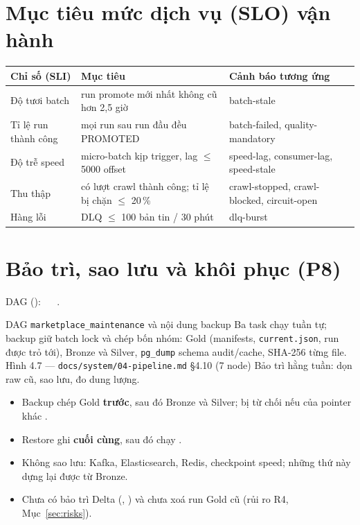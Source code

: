 \section{Mục tiêu mức dịch vụ (SLO) vận hành}
\begin{xltabular}{\linewidth}{@{}L{36mm}Y L{40mm}@{}}
  \toprule
  \textbf{Chỉ số (SLI)} & \textbf{Mục tiêu} & \textbf{Cảnh báo tương ứng} \\
  \midrule
  Độ tươi batch & run promote mới nhất không cũ hơn 2,5 giờ & batch-stale \\
  Tỉ lệ run thành công & mọi run sau run đầu đều PROMOTED & batch-failed, quality-mandatory \\
  Độ trễ speed & micro-batch kịp trigger, lag $\le$ 5000 offset & speed-lag, consumer-lag, speed-stale \\
  Thu thập & có lượt crawl thành công; tỉ lệ bị chặn $\le$ 20\,\% & crawl-stopped, crawl-blocked, circuit-open \\
  Hàng lỗi & DLQ $\le$ 100 bản tin / 30 phút & dlq-burst \\
  \bottomrule
\end{xltabular}

\section{Bảo trì, sao lưu và khôi phục (P8)}
DAG  ():  \ra\  \ra\ .

  {DAG \texttt{marketplace\_maintenance} và nội dung backup}
  {Ba task chạy tuần tự; backup giữ batch lock và chép bốn nhóm: Gold (manifests, \texttt{current.json}, run được trỏ tới), Bronze và Silver, \texttt{pg\_dump} schema audit/cache, SHA-256 từng file.}
  {Hình 4.7 — \texttt{docs/system/04-pipeline.md} §4.10 (7 node)}
  {Bảo trì hằng tuần: dọn raw cũ, sao lưu, đo dung lượng.}

\begin{itemize}
  \item Backup chép Gold \textbf{trước}, sau đó Bronze và Silver; bị từ chối nếu  của pointer khác .
  \item Restore ghi  \textbf{cuối cùng}, sau đó chạy .
  \item Không sao lưu: Kafka, Elasticsearch, Redis, checkpoint speed; những thứ này dựng lại được từ Bronze.
  \item Chưa có bảo trì Delta (, ) và chưa xoá run Gold cũ (rủi ro R4, Mục~\ref{sec:risks}).
\end{itemize}

